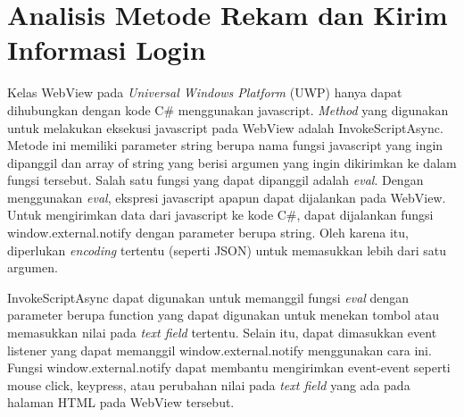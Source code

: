 \section{Analisis Metode Rekam dan Kirim Informasi Login}
\label{sec:metode_rekam}

Kelas WebView pada \textit{Universal Windows Platform} (UWP) hanya dapat dihubungkan dengan kode C\# menggunakan javascript. \textit{Method} yang digunakan untuk melakukan eksekusi javascript pada WebView adalah InvokeScriptAsync. Metode ini memiliki parameter string berupa nama fungsi javascript yang ingin dipanggil dan array of string yang berisi argumen yang ingin dikirimkan ke dalam fungsi tersebut. Salah satu fungsi yang dapat dipanggil adalah \textit{eval}. Dengan menggunakan \textit{eval}, ekspresi javascript apapun dapat dijalankan pada WebView. Untuk mengirimkan data dari javascript ke kode C\#, dapat dijalankan fungsi window.external.notify dengan parameter berupa string. Oleh karena itu, diperlukan \textit{encoding} tertentu (seperti JSON) untuk memasukkan lebih dari satu argumen.

InvokeScriptAsync dapat digunakan untuk memanggil fungsi \textit{eval} dengan parameter berupa function yang dapat digunakan untuk menekan tombol atau memasukkan nilai pada \textit{text field} tertentu. Selain itu, dapat dimasukkan event listener yang dapat memanggil window.external.notify menggunakan cara ini. Fungsi window.external.notify dapat membantu mengirimkan event-event seperti mouse click, keypress, atau perubahan nilai pada \textit{text field} yang ada pada halaman HTML pada WebView tersebut.